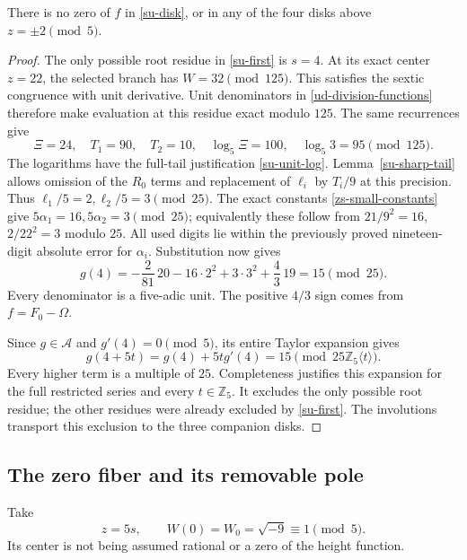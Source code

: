 \begin{theorem}
\label{su-no-zeros}
There is no zero of \(f\) in \eqref{su-disk}, or in any of the four
disks above \(z=\pm2\pmod5\).
\end{theorem}
\begin{proof}
The only possible root residue in \eqref{su-first} is \(s=4\).
At its exact center \(z=22\), the selected branch has
\(W=32\pmod{125}\). This satisfies the sextic congruence with
unit derivative. Unit denominators in \eqref{ud-division-functions}
therefore make evaluation at this residue exact modulo \(125\).
The same recurrences give
\[
 \Xi=24,\quad T_1=90,\quad T_2=10,\quad
 \log_5\Xi=100,\quad\log_5 3=95\pmod{125}.
\]
The logarithms have the full-tail justification
\eqref{su-unit-log}. Lemma~\ref{su-sharp-tail} allows omission of
the \(R_0\) terms and replacement of \(\ell_i\) by \(T_i/9\)
at this precision. Thus \(\ell_1/5=2,\ell_2/5=3\pmod{25}\).
The exact constants \eqref{zs-small-constants} give
\(5\alpha_1=16,5\alpha_2=3\pmod{25}\); equivalently these follow
from \(21/9^2=16\), \(2/22^2=3\) modulo \(25\).
All used digits lie within the previously proved nineteen-digit
absolute error for \(\alpha_i\). Substitution now gives
\begin{equation}
 g(4)=-\frac2{81}\,20-16\cdot2^2+3\cdot3^2
                     +\frac43\,19=15\pmod{25}.
 \label{su-obstruction}
\end{equation}
Every denominator is a five-adic unit. The positive \(4/3\) sign
comes from \(f=F_0-\Omega\).

Since \(g\in\mathcal A\) and \(g'(4)=0\pmod5\), its entire
Taylor expansion gives
\[
 g(4+5t)=g(4)+5tg'(4)=15\pmod{25\mathbb Z_5\langle t\rangle}.
\]
Every higher term is a multiple of \(25\). Completeness justifies
this expansion for the full restricted series and every
\(t\in\mathbb Z_5\). It excludes the only possible root residue;
the other residues were already excluded by \eqref{su-first}.
The involutions transport this exclusion to the three companion
disks.
\end{proof}

\subsection{The zero fiber and its removable pole}

Take
\begin{equation}
 z=5s,\qquad W(0)=W_0=\sqrt{-9}\equiv1\pmod5.
 \label{zd-disk}
\end{equation}
Its center is not being assumed rational or a zero of the height
function.

